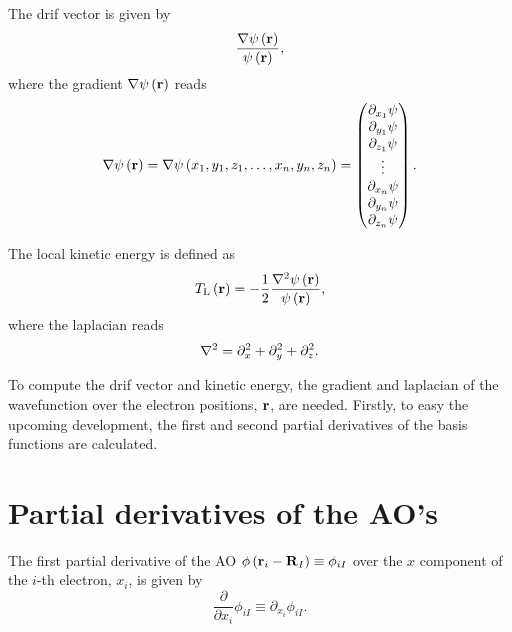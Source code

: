 The drif vector is given by 
\begin{equation} \label{eq:definition-drift-vector}
    \frac{
        \nabla \psi \left( \boldsymbol{\mathrm{r}} \right)
    }{
        \psi \left( \boldsymbol{\mathrm{r}} \right)
    }
    ,
\end{equation}
where the gradient $\nabla \psi \left( \boldsymbol{\mathrm{r}} \right)$ reads
\begin{equation} \label{eq:definition-gradient}
    \nabla
    \psi \left( \boldsymbol{\mathrm{r}} \right)
    =
    \nabla
    \psi \left( x_1, y_1, z_1, \ldots, x_n, y_n, z_n \right)
    =
    \begin{pmatrix}
        \partial_{x_1} \psi \\
        \partial_{y_1} \psi \\
        \partial_{z_1} \psi \\
        \vdots \\
        \partial_{x_n} \psi \\
        \partial_{y_n} \psi \\
        \partial_{z_n} \psi
    \end{pmatrix}
    .
\end{equation}

The local kinetic energy is defined as 
\begin{equation} \label{eq:definition-kinetic-energy}
    T_{\mathrm{L}} \left( \mat{r} \right)
    =
    - \frac{1}{2} \frac{\laplacian \psi \left( \mat{r} \right)}{\psi \left( \mat{r} \right)}
    ,
\end{equation}
where the laplacian reads
\begin{equation} \label{eq:definition-laplacian}
    \laplacian 
    =
    \partial_x^{2} + \partial_y^{2} + \partial_z^{2}
    .
\end{equation}

To compute the drif vector and kinetic energy, the gradient and laplacian of
the wavefunction over the electron positions, $ \boldsymbol{\mathrm{r}}$, are needed.
Firstly, to easy the upcoming development, the first and second partial 
derivatives of the basis functions are calculated.

\section{Partial derivatives of the AO's}
The first partial derivative of the AO
$\phi \left( \boldsymbol{\mathrm{r}}_i - \boldsymbol{\mathrm{R}}_I \right) \equiv \phi_{iI}$
over the $x$ component of the $i$-th
electron, $x_i$, is given by 
\begin{equation}
    \frac{\partial}{\partial x_i} \phi_{iI}
    \equiv
    \partial_{x_i} \phi_{iI}
    .
\end{equation}

